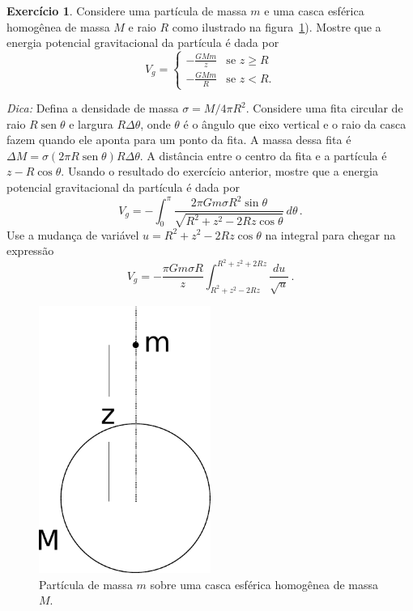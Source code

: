 \documentclass[12pt,a4paper]{article}
\theoremstyle{definition}
\newtheorem{ex}{Exercício}[section]
\DeclareMathOperator{\sen}{sen}
\begin{document}
\begin{ex}
  \label{ex:potencial.casca}
  Considere uma partícula de massa $m$ e uma casca esférica homogênea
  de massa $M$ e raio $R$ como ilustrado na
  figura~\ref{fig:potencial_esfera}). Mostre que a energia potencial
  gravitacional da partícula é dada por
  $$V_g=
  \begin{cases}
    -\frac{GMm}{z}&\text{se $z\ge R$}\\
    -\frac{GMm}{R}&\text{se $z<R$.}
  \end{cases}
  $$

  \noindent\textit{Dica:} Defina a densidade de massa
  $\sigma=M/4\pi R^2$. Considere uma fita circular de raio
  $R\sen\theta$ e largura $R\Delta\theta$, onde $\theta$ é o ângulo
  que eixo vertical e o raio da casca fazem quando ele aponta para um
  ponto da fita. A massa dessa fita é
  $\Delta M=\sigma(2\pi R\sen\theta)R\Delta\theta$. A distância entre
  o centro da fita e a partícula é $z-R\cos\theta$. Usando o resultado
  do exercício anterior, mostre que a energia potencial gravitacional
  da partícula é dada por
  $$V_g=-\int_0^{\pi}\frac{2\pi Gm\sigma R^2\sin\theta}{\sqrt{R^2+z^2-2Rz\cos\theta}}\,d\theta\,.$$
  Use a mudança de variável $u=R^2+z^2-2Rz\cos\theta$ na integral para
  chegar na expressão
  $$V_g=-\frac{\pi Gm\sigma R}{z}\int_{R^2+z^2-2Rz}^{R^2+z^2+2Rz}\frac{du}{\sqrt{u}}\,.$$
  \begin{figure}[t]
    \centering
    \includegraphics[width=0.5\textwidth,keepaspectratio]{aux/potencial_esfera.pdf}
    \caption{Partícula de massa $m$ sobre uma casca esférica homogênea
      de massa $M$.}
    \label{fig:potencial_esfera}
  \end{figure}
\end{ex}
\end{document}
